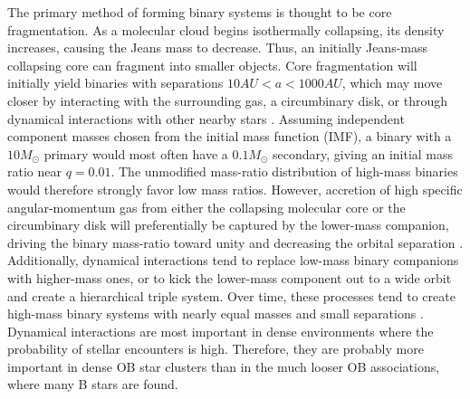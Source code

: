 The primary method of forming binary systems is thought to be core fragmentation. As a molecular cloud begins isothermally collapsing, its density increases, causing the
Jeans mass to decrease. Thus, an initially Jeans-mass collapsing core
can fragment into smaller objects. Core fragmentation will initially yield binaries with separations
$10 AU < a < 1000 AU$, which may move closer by interacting
with the surrounding gas, a circumbinary disk, or through dynamical
interactions with other nearby stars \citep{BBB2002}. Assuming
independent component masses chosen from the initial mass function (IMF), 
a binary with a $10 M_{\odot}$ primary would
most often have a $0.1 M_{\odot}$ secondary, giving an initial mass
ratio near $q=0.01$. The unmodified mass-ratio distribution of
high-mass binaries would therefore strongly favor low mass
ratios. However, accretion of high specific angular-momentum gas
from either the collapsing molecular core or
the circumbinary disk will preferentially be captured by the
lower-mass companion, driving the binary mass-ratio toward unity and
decreasing the orbital separation
\citep{Bate2000, BonnellBate2005}. Additionally, dynamical
interactions tend to replace low-mass binary companions with higher-mass ones, or to kick the lower-mass component out to a wide orbit and create a hierarchical triple system. Over time, these processes tend to create high-mass binary systems 
with nearly equal masses and small separations \citep{BBB2002}. Dynamical interactions are most important in dense environments where the probability of stellar encounters is high. Therefore, they are probably more important in dense OB star clusters than in the much looser OB associations, where many B stars are found.

